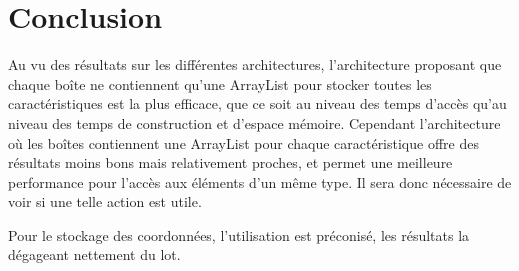 \section{Conclusion}
Au vu des résultats sur les différentes architectures, l'architecture proposant que chaque boîte ne contiennent qu'une ArrayList pour stocker toutes les caractéristiques est la plus efficace, que ce soit au niveau des temps d'accès qu'au niveau des temps de construction et d'espace mémoire. Cependant l'architecture où les boîtes contiennent une ArrayList pour chaque caractéristique offre des résultats moins bons mais relativement proches, et permet une meilleure performance pour l'accès aux éléments d'un même type. Il sera donc nécessaire de voir si une telle action est utile.

Pour le stockage des coordonnées, l'utilisation est préconisé, les résultats la dégageant nettement du lot. 